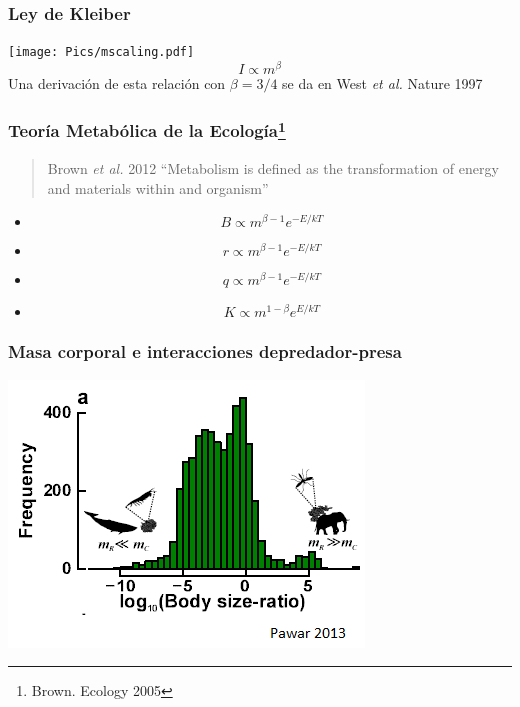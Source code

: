 \documentclass[11 pt,t]{beamer}
\begin{document}
\begin{frame}
  \frametitle{Ley de Kleiber} 
  \centering
  \texttt{[image: Pics/mscaling.pdf]}
  \begin{equation} I \propto m^{\beta} \end{equation}
  Una derivaci\'on de esta relaci\'on con $\beta = 3/4$ se da en West \textit{et al.} Nature 1997
\end{frame}
\begin{frame}
  \frametitle{Teor\'ia Metab\'olica de la Ecolog\'ia\footnote{Brown. Ecology 2005}}
  \begin{quote}{Brown \textit{et al.} 2012}
    ``Metabolism is defined as the transformation of energy and materials within and organism''
  \end{quote}
  
  \begin{itemize}
  \item \begin{equation} B \propto m^{\beta - 1}e^{-E/kT} \end{equation}
  \item \begin{equation} r \propto m^{\beta - 1}e^{-E/kT} \end{equation}
  \item \begin{equation} q \propto m^{\beta - 1}e^{-E/kT} \end{equation}
  \item \begin{equation} K \propto m^{1 - \beta}e^{E/kT} \end{equation}
  \end{itemize}
  
\end{frame}
\begin{frame}
  \frametitle{Masa corporal e interacciones depredador-presa}
  \centering
      \includegraphics[width = 0.7\linewidth]{Pics/bz.png}      
\end{frame}
\end{document}
